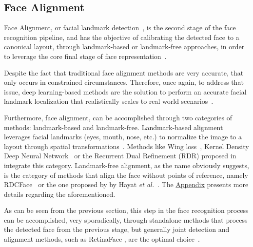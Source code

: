 \documentclass[class=report, crop=false, a4paper, 12pt]{standalone}
\begin{document}
\subsection{Face Alignment}
\par Face Alignment, or facial landmark detection~\autocite{changFacePoseNetMakingCase2017}, is the second stage of the face recognition pipeline, and has the objective of calibrating the detected face to a canonical layout, through landmark-based or landmark-free approaches, in order to leverage the core final stage of face representation~\autocite{duElementsEndtoendDeep2022}. 
\par Despite the fact that traditional face alignment methods are very accurate, that only occurs in constrained circumstances. Therefore, once again, to address that issue, deep learning-based methods are the solution to perform an accurate facial landmark localization that realistically scales to real world scenarios~\autocite{fengWingLossRobust2018}. 
\par Furthermore, face alignment, can be accomplished through two categories of methods: landmark-based and landmark-free. Landmark-based alignment leverages facial landmarks (eyes, mouth, nose, etc.) to normalize the image to a layout through spatial transformations~\autocite{duElementsEndtoendDeep2022}. Methods like Wing loss~\autocite{fengWingLossRobust2018}, Kernel Density Deep Neural Network~\autocite{chenFaceAlignmentKernel2019} or the Recurrent Dual Refinement (RDR) proposed in~\autocite{xiaoRecurrent3D2DDual2017} integrate this category. Landmark-free alignment, as the name obviously suggests, is the category of methods that align the face without points of reference, namely RDCFace~\autocite{zhaoRDCFaceRadialDistortion2020} or the one proposed by by Hayat \textit{et al.}~\autocite{hayatJointRegistrationRepresentation2017}. The \hyperref[sec:face_alignment_appendix]{Appendix} presents more details regarding the aforementioned.

\vspace{0.7\baselineskip}
\par As can be seen from the previous section, this step in the face recognition process can be accomplished, very sporadically, through standalone methods that process the detected face from the previous stage, but generally joint detection and alignment methods, such as RetinaFace \autocite{dengRetinaFaceSinglestageDense2019}, are the optimal choice~\autocite{changFacePoseNetMakingCase2017}.
\end{document}
